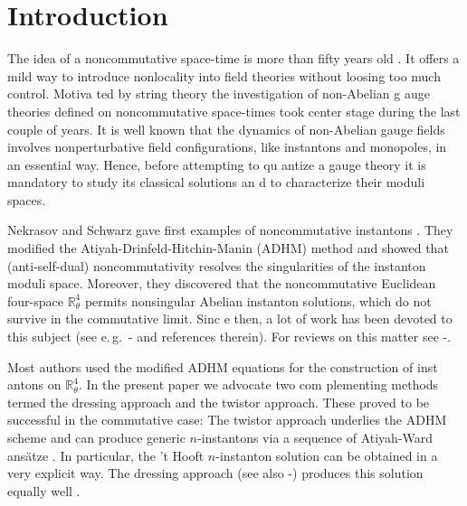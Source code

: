 \documentclass[a4paper,11pt,english]{article}
\numberwithin{equation}{section}
\renewcommand{\=}{\ =\ }
\begin{document}


\section{Introduction}

The idea of a noncommutative space-time is more than fifty years old 
\cite{Snyder:1947qz}. It offers a mild way to introduce nonlocality %
 into field theories without loosing too much control. Motiva%
ted by string theory \cite{Seiberg:1999vs} the investigation of non-Abelian g%
auge theories defined on noncommutative space-times took center stage %
 during the last couple of years. It is well known that 
 the dynamics of non-Abelian gauge fields involves nonperturbative field %
 configurations, like instantons and monopoles, in an essential way. 
Hence, before attempting to qu%
antize a gauge theory it is mandatory to study its classical solutions an%
d to characterize their moduli spaces. %

Nekrasov and Schwarz gave first examples of noncommutative instantons 
\cite{Nekrasov:1998ss}. They modified the Atiyah-Drinfeld-Hitchin-Manin (ADHM) 
method \cite{Atiyah:1978ri} and showed that (anti-self-dual) noncommutativity 
resolves the singularities of the instanton moduli space. Moreover, they 
discovered that the noncommutative Euclidean four-space $\mathbb{R}^4_\theta$ 
permits nonsingular Abelian instanton solutions, which do not survive in the 
commutative limit. Sinc%
e then, a lot of work has been devoted to this subject (see e.\,g.\ \cite%
{Braden:1999zp}-\cite{Franco-Sollova:2002nn} and references therein). For %
 reviews on this matter see \cite{Nekrasov:2000ih}-\cite{Nekrasov:2002kc}.

Most authors used the modified ADHM equations for the construction of inst%
antons on $\mathbb{R}^4_\theta$. In the present paper we advocate two com%
plementing methods termed the dressing approach and the twistor approach.
These proved to be successful in the commutative case: 
The twistor approach underlies the ADHM %
 scheme \cite{Atiyah:1978ri} and can produce generic $n$-instantons via a %
 sequence of Atiyah-Ward ans\"atze \cite{Atiyah:1977pw,WardWells}. %
 In particular, the 't Hooft $n$-instanton solution can be obtained in a %
very explicit way. The dressing approach \cite{zak} (see also 
\cite{Zakharov:pp}-\cite{Ward:vc}) produces this solution equally well 
\cite{Forgacs:1981su}.
\end{document}
